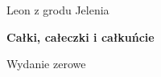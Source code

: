 

\thispagestyle{empty}
{\noindent\fontsize{18pt}{18pt}\selectfont Leon z grodu Jelenia}

\noindent\makebox[\linewidth]{\rule{\textwidth}{1pt}}

\vspace{10mm}

{\noindent\fontsize{24pt}{24pt}\selectfont \textbf{Całki, całeczki i całkuńcie}}
\vspace{10mm}

{\noindent\fontsize{14pt}{14pt}\selectfont Wydanie zerowe}

\newpage


